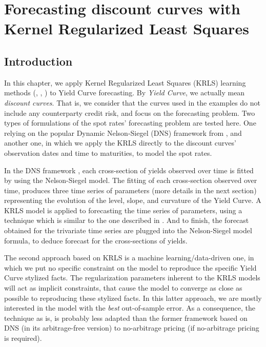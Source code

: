 %
\chapter{Forecasting discount curves with Kernel Regularized Least Squares}
\label{sec:discount_curve_krls}


\section{Introduction}

In this chapter, we apply Kernel Regularized Least Squares (KRLS) learning methods (\cite{jens2014kernel}, \cite{exterkate2016nonlinear}, \cite{ferwerda2017kernel}) to Yield Curve forecasting. By \textit{Yield Curve}, we actually mean \textit{discount curves}. That is, we consider that the curves used in the examples do not include any counterparty credit risk, and focus on the forecasting problem. Two types of formulations of the spot rates' forecasting problem are tested here. One relying on the popular Dynamic Nelson-Siegel (DNS) framework from \cite{diebold2006forecasting}, and another one, in which we apply the KRLS directly to the discount curves' observation dates and time to maturities, to model the spot rates.

\medskip

In the DNS framework \cite{diebold2006forecasting}, each cross-section of yields observed over time is fitted by using the Nelson-Siegel \cite{nelson1987parsimonious} model. The fitting of each cross-section observed over time, produces three time series of parameters (more details in the next section) representing the evolution of the level, slope, and curvature of the Yield Curve. A KRLS model is applied to forecasting  the time series of parameters, using a technique which is similar to the one described in \cite{exterkate2016nonlinear}. And to finish, the forecast obtained for the trivariate time series are plugged into the Nelson-Siegel model formula, to deduce forecast for the cross-sections of yields.

\medskip

The second approach based on KRLS is a machine learning/data-driven one, in which we put no  specific constraint on the model to reproduce the specific Yield Curve stylized facts. The regularization parameters inherent to the KRLS models will act as implicit constraints, that cause the model to converge as close as possible to reproducing these stylized facts. In this latter approach, we are mostly interested in the model with the {\it best} out-of-sample error. As a consequence, the technique as is, is probably less adapted than the former framework based on DNS (in its arbitrage-free version) to no-arbitrage pricing (if no-arbitrage pricing is required).

